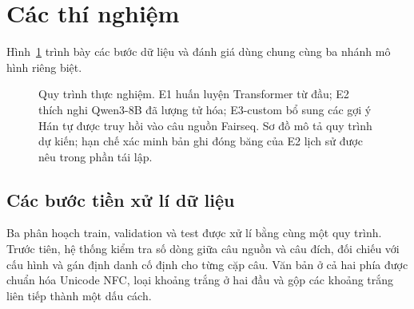 \documentclass[11pt,twocolumn]{article}
\begin{document}
\section{Các thí nghiệm}
Hình~\ref{fig:pipeline} trình bày các bước dữ liệu và đánh giá dùng chung cùng
ba nhánh mô hình riêng biệt.

\begin{figure}[t]
  \centering
  \caption{Quy trình thực nghiệm. E1 huấn luyện Transformer từ đầu; E2 thích
  nghi Qwen3-8B đã lượng tử hóa; E3-custom bổ sung các gợi ý Hán tự được truy
  hồi vào câu nguồn Fairseq. Sơ đồ mô tả quy trình dự kiến; hạn chế xác minh
  bản ghi đóng băng của E2 lịch sử được nêu trong phần tái lập.}
  \label{fig:pipeline}
\end{figure}

\subsection{Các bước tiền xử lí dữ liệu}

Ba phân hoạch train, validation và test được xử lí bằng cùng một quy trình.
Trước tiên, hệ thống kiểm tra số dòng giữa câu nguồn và câu đích, đối chiếu với
cấu hình và gán định danh cố định cho từng cặp câu. Văn bản ở cả hai phía được
chuẩn hóa Unicode NFC, loại khoảng trắng ở hai đầu và gộp các khoảng trắng liên
tiếp thành một dấu cách.
\end{document}
